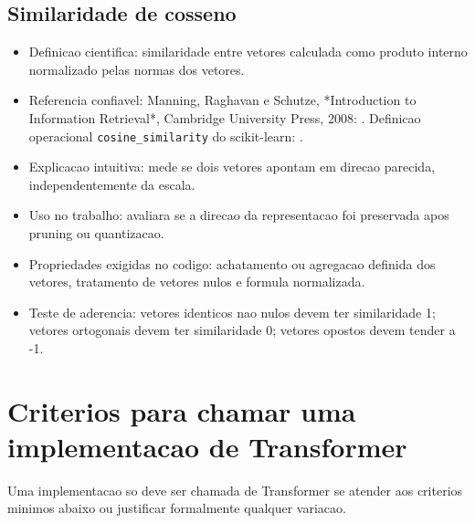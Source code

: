 \subsection{Similaridade de cosseno}


\begin{itemize}
\item Definicao cientifica: similaridade entre vetores calculada como produto
interno normalizado pelas normas dos vetores.
\item Referencia confiavel: Manning, Raghavan e Schutze, *Introduction to
Information Retrieval*, Cambridge University Press, 2008:
. Definicao
operacional \texttt{cosine\_\allowbreak{}similarity} do scikit-learn:
.
\item Explicacao intuitiva: mede se dois vetores apontam em direcao parecida,
independentemente da escala.
\item Uso no trabalho: avaliara se a direcao da representacao foi preservada apos
pruning ou quantizacao.
\item Propriedades exigidas no codigo: achatamento ou agregacao definida dos
vetores, tratamento de vetores nulos e formula normalizada.
\item Teste de aderencia: vetores identicos nao nulos devem ter similaridade 1;
vetores ortogonais devem ter similaridade 0; vetores opostos devem tender a
-1.
\end{itemize}


\section{Criterios para chamar uma implementacao de Transformer}




Uma implementacao so deve ser chamada de Transformer se atender aos criterios minimos abaixo ou justificar formalmente qualquer variacao.



